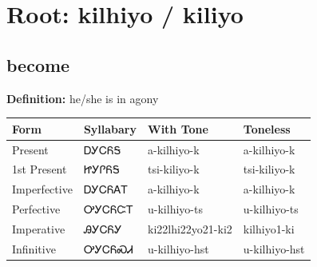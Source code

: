 \documentclass{article}%
\begin{document}
%
\normalsize%
\section*{Root: kilhiyo / kiliyo}%
\subsection*{become}%
\textbf{Definition: }%
he/she is in agony%
\\[0.5em]%
\begin{tabular}{|l|l|l|l|}%
\hline%
\textbf{Form}&\textbf{Syllabary}&\textbf{With Tone}&\textbf{Toneless}\\%
\hline%
Present&ᎠᎩᏟᏲᎦ&a{-}kilhiyo{-}k&a{-}kilhiyo{-}k\\%
1st Present&ᏥᎩᎵᏲᎦ&tsi{-}kiliyo{-}k&tsi{-}kiliyo{-}k\\%
Imperfective&ᎠᎩᏟᏲᎪᎢ&a{-}kilhiyo{-}k&a{-}kilhiyo{-}k\\%
Perfective&ᎤᎩᏟᏲᏨᎢ&u{-}kilhiyo{-}ts&u{-}kilhiyo{-}ts\\%
Imperative&ᎯᎩᏟᏲᎩ&ki22lhi22yo21{-}ki2&kilhiyo1{-}ki\\%
Infinitive&ᎤᎩᏟᏲᏍᏗ&u{-}kilhiyo{-}hst&u{-}kilhiyo{-}hst\\%
\hline%
\end{tabular}%
\\[1em]%
\end{document}
